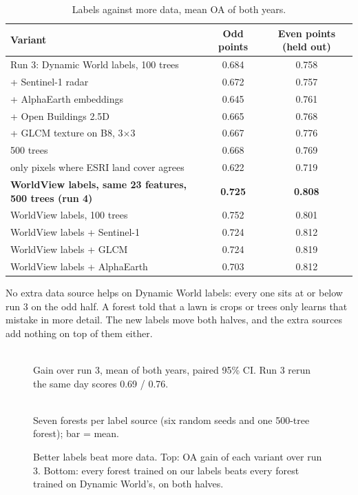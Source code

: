 \documentclass[11pt,a4paper]{article}
\begin{document}
\begin{table}[htbp]
\centering\small
\caption{Labels against more data, mean OA of both years.}
\label{tab:variants4}
\begin{tabular}{@{}lcc@{}}
\toprule
Variant & Odd points & Even points (held out)\\
\midrule
Run 3: Dynamic World labels, 100 trees & 0.684 & 0.758\\
+ Sentinel-1 radar & 0.672 & 0.757\\
+ AlphaEarth embeddings & 0.645 & 0.761\\
+ Open Buildings 2.5D & 0.665 & 0.768\\
+ GLCM texture on B8, 3$\times$3 & 0.667 & 0.776\\
500 trees & 0.668 & 0.769\\
only pixels where ESRI land cover agrees & 0.622 & 0.719\\
\textbf{WorldView labels, same 23 features, 500 trees (run 4)} & \textbf{0.725} & \textbf{0.808}\\
WorldView labels, 100 trees & 0.752 & 0.801\\
WorldView labels + Sentinel-1 & 0.724 & 0.812\\
WorldView labels + GLCM & 0.724 & 0.819\\
WorldView labels + AlphaEarth & 0.703 & 0.812\\
\bottomrule
\end{tabular}
\end{table}

No extra data source helps on Dynamic World labels: every one sits at or below run 3 on the odd half. A forest told that a lawn is crops or trees only learns that mistake in more detail. The new labels move both halves, and the extra sources add nothing on top of them either.

\begin{figure}[htbp]
\centering
\begin{tikzpicture}\end{tikzpicture}\\[1mm]
{\footnotesize\color{muted}Gain over run 3, mean of both years, paired 95\% CI. Run 3 rerun the same day scores 0.69 / 0.76.}\\[5mm]
\begin{tikzpicture}\end{tikzpicture}\\[1mm]
{\footnotesize\color{muted}Seven forests per label source (six random seeds and one 500-tree forest); bar = mean.}
\caption{Better labels beat more data. Top: OA gain of each variant over run 3. Bottom: every forest trained on our labels beats every forest trained on Dynamic World's, on both halves.}
\label{fig:labeltest}
\end{figure}
\end{document}
